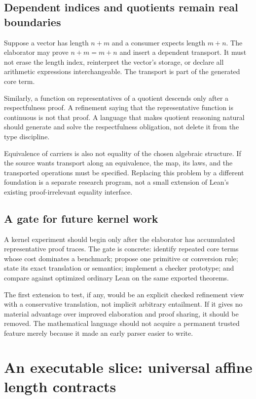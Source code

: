 \documentclass[11pt,letterpaper]{article}
\theoremstyle{definition}
\theoremstyle{remark}
\begin{document}
\subsection{Dependent indices and quotients remain real boundaries}
Suppose a vector has length $n+m$ and a consumer expects length $m+n$. The
elaborator may prove $n+m=m+n$ and insert a dependent transport. It must not erase
the length index, reinterpret the vector's storage, or declare all arithmetic
expressions interchangeable. The transport is part of the generated core term.

Similarly, a function on representatives of a quotient descends only after a
respectfulness proof. A refinement saying that the representative function is
continuous is not that proof. A language that makes quotient reasoning natural
should generate and solve the respectfulness obligation, not delete it from the
type discipline.

Equivalence of carriers is also not equality of the chosen algebraic structure.
If the source wants transport along an equivalence, the map, its laws, and the
transported operations must be specified. Replacing this problem by a different
foundation is a separate research program, not a small extension of Lean's
existing proof-irrelevant equality interface.

\subsection{A gate for future kernel work}
A kernel experiment should begin only after the elaborator has accumulated
representative proof traces. The gate is concrete: identify repeated core terms
whose cost dominates a benchmark; propose one primitive or conversion rule;
state its exact translation or semantics; implement a checker prototype; and
compare against optimized ordinary Lean on the same exported theorems.

The first extension to test, if any, would be an explicit checked refinement view
with a conservative translation, not implicit arbitrary entailment. If it gives
no material advantage over improved elaboration and proof sharing, it should be
removed. The mathematical language should not acquire a permanent trusted
feature merely because it made an early parser easier to write.

\section{An executable slice: universal affine length contracts}\label{sec:prototype}
\end{document}
